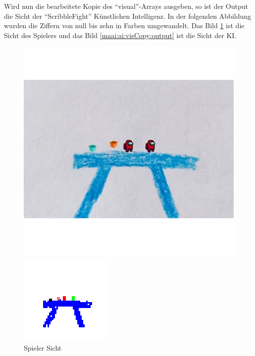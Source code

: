 Wird nun die bearbeitete Kopie des ``visual''-Arrays ausgeben, so ist der Output die Sicht der ``ScribbleFight'' Künstlichen Intelligenz. In der folgenden Abbildung wurden die Ziffern von null bis zehn in Farben umgewandelt. Das Bild \ref{maai:ai:visCopy:input} ist die Sicht des Spielers und das Bild \ref{maai:ai:visCopy:output} ist die Sicht der KI.

\begin{figure}[H]
    \centering
    \begin{minipage}[t]{0.45\linewidth}
        \centering
        \includegraphics[width=\linewidth]{pics/ai/screenshots.png}
        \caption{Spieler Sicht}
        \label{maai:ai:visCopy:input}
    \end{minipage}
    \hfill
    \begin{minipage}[t]{0.45\linewidth}
        \centering
        \includegraphics[width=\linewidth]{pics/ai/newImg.png}

\end{minipage}
\end{figure}
